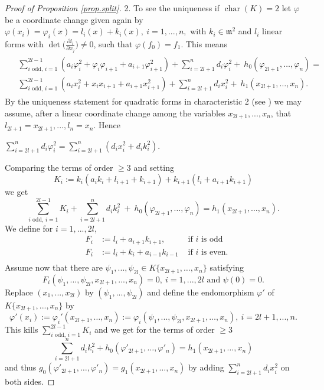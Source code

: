 \documentclass[11pt]{article}
\DeclareMathOperator{\Char}{char}
\newcommand{\fm}{\mathfrak{m}}
\begin{document}
\begin{proof}[Proof of Proposition \ref{prop.split}]
2.  To see the uniqueness if $\Char(K)=2$
let $\varphi$  be a coordinate change given again by  
$\varphi(x_i) = \varphi_i(x) = l_i(x)+k_i(x), \ i=1,...,n,$
with $k_i \in \fm^2$ and $l_i$ linear forms with $\det \big(\frac{\partial l_i}{\partial x_j}\big) \ne 0$, such that
$\varphi (f_0)= f_1$. This means
\begin{align}
\tag{*}\label{*}
\begin{split}
 &\sum_{i \text{ odd, } i=1}^{2l-1}(a_i \varphi_i^2 + \varphi_i\varphi_{i+1} +
a_{i+1} \varphi_{i+1}^2) +  \sum_{i=2l+1}^{n}d_i \varphi_i^2 + \ h_0(\varphi_{2l+1},\ldots,\varphi_n) =\\ 
& \sum_{i \text{ odd, } i=1}^{2l-1}(a_i x_i^2 + x_ix_{i+1} +
a_{i+1} x_{i+1}^2) + \sum_{i=2l+1}^{n}d_i x_i^2 + \ h_1(x_{2l+1},\ldots,x_n).
\end{split}
\end{align}
By the uniqueness statement  for quadratic forms in characteristic 2 (see \cite[Theorem 3.1] {GP25}) we may assume,
after a linear coordinate change among the variables  $x_{2l+1},...,x_n$, that $l_{2l+1} = x_{2l+1},...,l_{n} = x_{n}$. Hence
\begin{center}
$\sum_{i=2l+1}^{n}d_i \varphi_i^2 = \sum_{i=2l+1}^{n}(d_i x_i^2 + d_ik_i^2).$
\end{center}
\noindent 
Comparing the terms of  order $\ge 3$ and setting 
$$K_i := k_i(a_ik_i +l_{i+1}+k_{i+1}) + k_{i+1}(l_i+a_{i+1}k_{i+1})$$
 we get
 $$\sum_{i \text{ odd, } i=1}^{2l-1} K_i + \sum_{i=2l+1}^{n}d_i k_i^2 \ +  \ h_0(\varphi_{2l+1},\ldots,\varphi_n)
 =  h_1(x_{2l+1},\ldots,x_n).$$
We define for $i=1,...,2l$, 
$$
\begin{array}{llll} 
&  F_i &:= l_i +a_{i+1}k_{i+1}, &\text{ if } i  \text{ is odd}\\
&  F_i &:= l_i + k_i  + a_{i-1}k_{i-1} &\text{ if } i \text{ is even}.\\
\end{array}
$$ 
Assume now that there are $\psi_1,...,\psi_{2l} \in K\{ x_{2l+1},\ldots,x_n\}$ satisfying 
$$F_i (\psi_1,...,\psi_{2l}, x_{2l+1},...,x_n)=0, \ i = 1,...,2l \text{ and } \psi(0)=0.$$
Replace $(x_1,...,x_{2l})$ by $(\psi_1,...,\psi_{2l})$ 
and define the endomorphism $\varphi'$ of $K\{ x_{2l+1},...,x_n\}$
by
 $$\varphi'(x_i):= \varphi_i'(x_{2l+1},\ldots,x_n) := 
 \varphi_i(\psi_1,...,\psi_{2l},x_{2l+1},\ldots,x_n), \ i = 2l+1,...,n.$$ 
This kills  
$\sum_{i \text{ odd, } i=1}^{2l-1} K_i 
$
and we get for the terms of order $\ge 3$
$$\sum_{i=2l+1}^{n}d_i k_i^2+h_0(\varphi'_{2l+1},\ldots,\varphi'_n) =
h_1(x_{2l+1},\ldots,x_n)$$
 and thus $g_0(\varphi'_{2l+1},\ldots,\varphi'_n) =
g_1(x_{2l+1},\ldots,x_n)$ by adding $\sum_{i=2l+1}^{n}d_i x_i^2$ on both sides.
\medskip


\end{proof}
\end{document}
